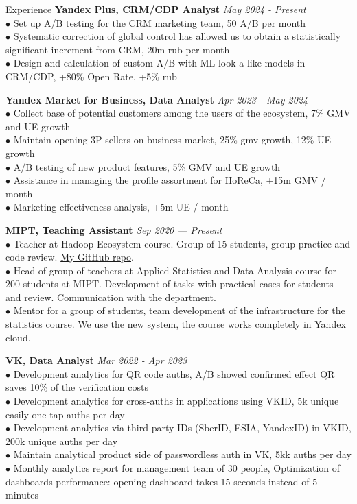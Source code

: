 \documentclass{resume} %
\begin{document}
\begin{rSection}{ Experience }
    { \bf Yandex Plus, CRM/CDP Analyst} \hfill {\em May 2024 - Present}\\
    { $\bullet$ Set up A/B testing for the CRM marketing team, 50 A/B per month} \\
    { $\bullet$ Systematic correction of global control has allowed us to obtain a statistically significant increment from CRM, 20m rub per month } \\
    { $\bullet$ Design and calculation of custom A/B with ML look-a-like models in CRM/CDP, +80\% Open Rate, +5\% rub}
    
    { \bf Yandex Market for Business, Data Analyst} \hfill {\em Apr 2023 - May 2024}\\
    { $\bullet$ Collect base of potential customers among the users of the ecosystem, 7\% GMV and UE growth } \\
    { $\bullet$ Maintain opening 3P sellers on business market, 25\% gmv growth, 12\% UE growth} \\
    { $\bullet$ A/B testing of new product features, 5\% GMV and UE growth} \\ 
    { $\bullet$ Assistance in managing the profile assortment for HoReCa, +15m GMV / month} \\
    { $\bullet$ Marketing effectiveness analysis, +5m UE / month}

    { \bf MIPT, Teaching Assistant} \hfill {\em Sep 2020 — Present}\\
    { $\bullet$ Teacher at Hadoop Ecosystem course. Group of 15 students, group practice and code review. \href{https://github.com/YHx07/pd-seminars}{My GitHub repo}.}\\
    { $\bullet$ Head of group of teachers at Applied Statistics and Data Analysis course for 200 students at MIPT. Development of tasks with practical cases for students and review. Communication with the department. }\\
    { $\bullet$ Mentor for a group of students, team development of the infrastructure for the statistics course. We use the new system, the course works completely in Yandex cloud.}

    { \bf VK, Data Analyst} \hfill {\em Mar 2022 - Apr 2023}\\
    { $\bullet$ Development analytics for QR code auths, A/B showed confirmed effect QR saves 10\% of the verification costs} \\
    { $\bullet$ Development analytics for cross-auths in applications using VKID, 5k unique easily one-tap auths per day}\\
    { $\bullet$ Development analytics via third-party IDs (SberID, ESIA, YandexID) in VKID, 200k unique auths per day}\\
    { $\bullet$ Maintain analytical product side of passwordless auth in VK, 5kk auths per day }\\
    {$\bullet$ Monthly analytics report for management team of 30 people, Optimization of dashboards performance: opening dashboard takes 15 seconds instead of 5 minutes}


\end{rSection}
\end{document}
